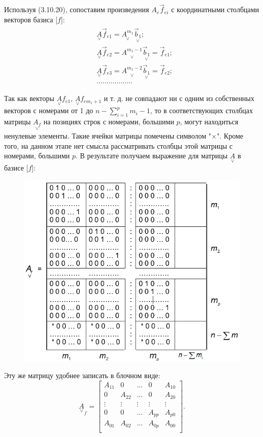 Используя (3.10.20), сопоставим произведения ${A_e}\vec{f}_{ei}$ с координатными столбцами векторов базиса [$f$]:
\begin{gather}
\begin{split}
	&\underset{\lor}{A}\vec{f}_{e1}=\underset{\lor}{A^{m_1}}\underset{\lor}{\vec{b}_1};\\
	&\underset{\lor}{A}\vec{f}_{e2}=\underset{\lor}{A^{m_1-1}}\underset{\lor}{\vec{b}_1}=\vec{f}_{e1};\\
	&\underset{\lor}{A}\vec{f}_{e3}=\underset{\lor}{A^{m_1-2}}\underset{\lor}{\vec{b}_1}=\vec{f}_{e2};\\
	&\dots\dots\dots\dots\dots\dots
\end{split}
\end{gather}

Так как векторы $\underset{\lor}{A}f_{e1}$, $\underset{\lor}{A}f_{em_1+1}$ и т. д. не совпадают ни с одним из собственных векторов с номерами от 1 до $n-\sum_{i=1}^{p}m_i-1$, то в соответствующих столбцах матрицы $\underset{\lor}{A_f}$ на позициях строк с номерами, большими $p$, могут находиться ненулевые элементы. Такие ячейки матрицы помечены символом "$\times$". Кроме того, на данном этапе нет смысла рассматривать столбцы этой матрицы с номерами, большими $p$. В результате получаем выражение для матрицы $\underset{\lor}{A}$ в базисе [$f$]:	
\begin{figure}[H]
	\centering
	\includegraphics[scale=0.9]{images/Fig3_12_1}
\end{figure}
Эту же матрицу удобнее записать в блочном виде:
\begin{equation}
	\underset{\lor}{A}_f=\begin{bmatrix}
	A_{11} & 0 & \dots & 0 & A_{10}\\
	0 & A_{22} & \dots & 0 & A_{20}\\
	\vdots & \vdots & \vdots & \vdots & \vdots\\
	0 & 0 & \dots & A_{pp} & A_{p0}\\
	A_{01} & A_{02} & \dots & A_{0p} & A_{00}\\
	\end{bmatrix}.
\end{equation}

